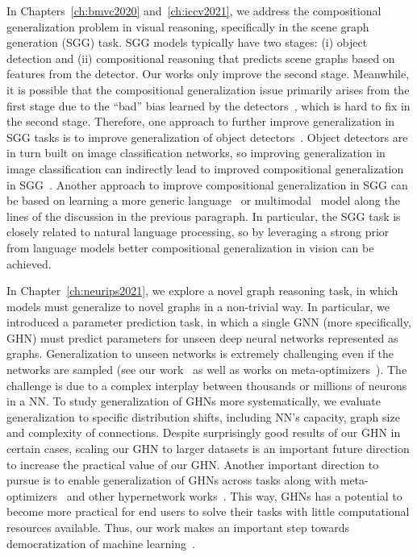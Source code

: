 In Chapters~\ref{ch:bmvc2020} and~\ref{ch:iccv2021}, we address the compositional generalization problem in visual reasoning, specifically in the scene graph generation (SGG) task. SGG models typically have two stages: (i) object detection and (ii) compositional reasoning that predicts scene graphs based on features from the detector. Our works only improve the second stage. Meanwhile, it is possible that the compositional generalization issue primarily arises from the first stage due to the ``bad'' bias learned by the detectors~\citep{michaelis2019benchmarking}, which is hard to fix in the second stage.
Therefore, one approach to further improve generalization in SGG tasks is to improve generalization of object detectors~\citep{shen2021towards}. Object detectors are in turn built on image classification networks, so improving generalization in image classification can indirectly lead to improved compositional generalization in SGG~\citep{li2020shape,chen2021robust}. Another approach to improve compositional generalization in SGG can be based on learning a more generic language~\citep{brown2020language,cobbe2021training} or multimodal~\citep{radford2021learning} model along the lines of the discussion in the previous paragraph. In particular, the SGG task is closely related to natural language processing, so by leveraging a strong prior from language models better compositional generalization in vision can be achieved.

In Chapter~\ref{ch:neurips2021}, we explore a novel graph reasoning task, in which models must generalize to novel graphs in a non-trivial way. In particular, we introduced a parameter prediction task, in which a single GNN (more specifically, GHN) must predict parameters for unseen deep neural networks represented as graphs. Generalization to unseen networks is extremely challenging even if the networks are \IID sampled (see our work~\citep{knyazev2021parameter} as well as works on meta-optimizers~\citep{wichrowska2017learned,metz2020tasks}). The challenge is due to a complex interplay between thousands or millions of neurons in a NN. To study generalization of GHNs more systematically, we evaluate generalization to specific distribution shifts, including NN's capacity, graph size and complexity of connections.
Despite surprisingly good results of our GHN in certain cases, scaling our GHN to larger datasets is an important future direction to increase the practical value of our GHN. Another important direction to pursue is to enable generalization of GHNs across tasks along with meta-optimizers~\citep{metz2020tasks} and other hypernetwork works~\citep{anonymous2021HyperTransformer}. This way, GHNs has a potential to become more practical for end users to solve their tasks with little computational resources available. Thus, our work makes an important step towards democratization of machine learning~\citep{ahmed2020democratization,abdalla2021grey}.
